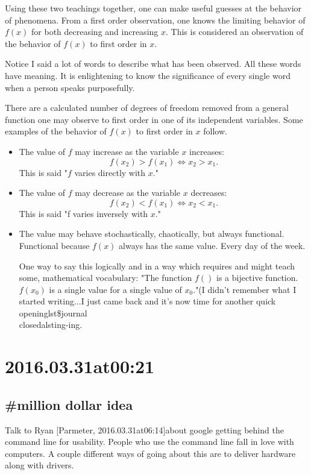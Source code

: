 Using these two teachings together, one can make useful guesses at the behavior of phenomena. From a first order observation, one knows the limiting behavior of $f(x)$ for both decreasing and increasing $x$. This is considered an observation of the behavior of $f(x)$ to first order in $x$.

Notice I said a lot of words to describe what has been observed. All these words have meaning. It is enlightening to know the significance of every single word when a person speaks purposefully.

There are a calculated number of degrees of freedom removed from a general function one may observe to first order in one of its independent variables. Some examples of the behavior of $f(x)$ to first order in $x$ follow.

\begin{itemize}
\item The value of $f$ may increase as the variable $x$ increases:$$f(x_2) > f(x_1) \Leftrightarrow x_2 > x_1.$$ This is said "$f$ varies directly with $x$."
\item The value of $f$ may decrease as the variable $x$ decreases:$$f(x_2) < f(x_1) \Leftrightarrow x_2 < x_1.$$ This is said "f varies inversely with $x$."
\item The value may behave stochastically, chaotically, but always functional. Functional because $f(x)$ always has the same value. Every day of the week.

One way to say this logically and in a way which requires and might teach some, mathematical vocabulary:
"The function $f()$ is a bijective function. $f(x_0)$ is a single value for a single value of $x_0$."(I didn't remember what I started writing...I just came back and it's now time for another quick \\openinglst\$journal\\closedalsting-ing.
\end{itemize}

\section*{ 2016.03.31at00:21 }
\subsection*{\#{million dollar idea}}
Talk to Ryan [Parmeter, 2016.03.31at06:14]about google getting behind the command line for usability. People who use the command line fall in love with computers. A couple different ways of going about this are to deliver hardware along with drivers.

